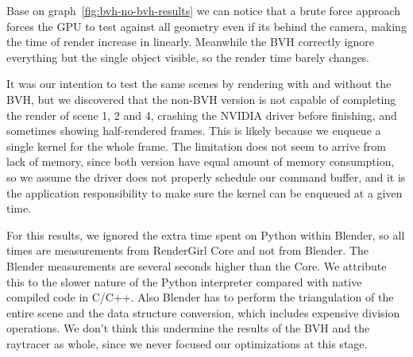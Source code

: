 \documentclass{vgtc}
\begin{document}
Base on graph~\ref{fig:bvh-no-bvh-results} we can notice that a brute
force approach forces the GPU to test against all geometry even if its
behind the camera, making the time of render increase in
linearly. Meanwhile the BVH correctly ignore everything but the single
object visible, so the render time barely changes.

It was our intention to test the same scenes by rendering with and
without the BVH, but we discovered that the non-BVH version is not
capable of completing the render of scene 1, 2 and 4, crashing the
NVIDIA driver before finishing, and sometimes showing half-rendered
frames. This is likely because we enqueue a single kernel for the
whole frame. The limitation does not seem to arrive from lack of
memory, since both version have equal amount of memory consumption, so
we assume the driver does not properly schedule our command buffer,
and it is the application responsibility to make sure the kernel can
be enqueued at a given time.

For this results, we ignored the extra time spent on Python within
Blender, so all times are measurements from RenderGirl Core and not
from Blender. The Blender measurements are several seconds higher than
the Core. We attribute this to the slower nature of the Python
interpreter compared with native compiled code in C/C++. Also Blender
has to perform the triangulation of the entire scene and the data
structure conversion, which includes expensive division operations. We
don't think this undermine the results of the BVH and the raytracer as
whole, since we never focused our optimizations at this stage.
\end{document}
